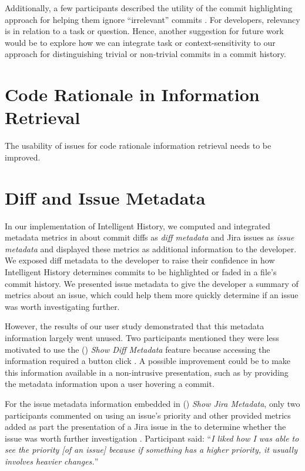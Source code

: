 Additionally, a few participants described the utility of the commit highlighting
approach for helping them ignore ``irrelevant'' commits .
For developers, relevancy is in relation to a task or question.
Hence, another suggestion for future work would be to explore how
we can integrate task or context-sensitivity to our approach for distinguishing trivial or non-trivial
commits in a commit history.


\section{Code Rationale in Information Retrieval}

The usability of issues for code rationale information retrieval needs to be improved.



\section{Diff and Issue Metadata}

In our implementation of Intelligent History,
we computed and integrated metadata metrics in about commit diffs as \emph{diff metadata} and Jira issues as \emph{issue metadata} 
and displayed these metrics as additional information to the developer.
We exposed diff metadata to the developer to raise their confidence in how Intelligent History
determines commits to be highlighted or faded in a file's commit history.
We presented issue metadata to give the developer a summary of metrics about
an issue, which could help them more quickly determine if an issue was worth investigating further.

However, the results of our user study demonstrated that this metadata information largely went unused.
Two participants mentioned they were less motivated to use the () \textit{Show Diff Metadata} feature
because accessing the information required a button click .
A possible improvement could be to make this information available in a non-intrusive presentation,
such as by providing the metadata information upon a user hovering a commit.

For the issue metadata information embedded in () \textit{Show Jira Metadata},
only two participants commented on using an issue's priority and other provided metrics added as part the presentation
of a Jira issue in the  to determine whether the issue was worth further investigation .
Participant  said: 
``\textit{I liked how I was able to see the priority [of an issue] because if something has a higher priority, it usually involves heavier changes.}''

